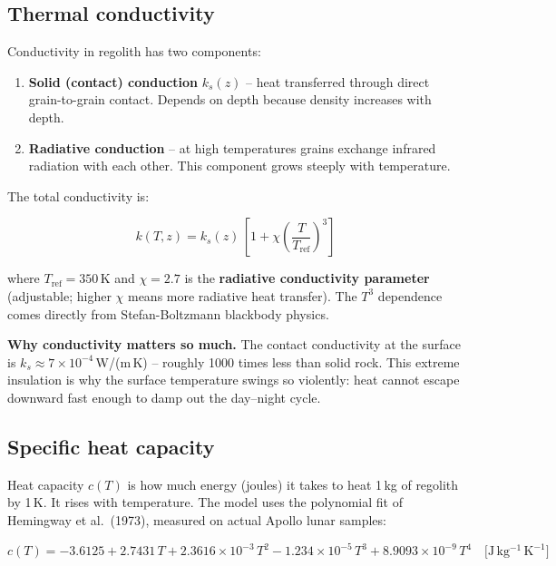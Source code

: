 \documentclass[12pt, a4paper]{article}
\begin{document}
\subsection{Thermal conductivity}

Conductivity in regolith has two components:

\begin{enumerate}[leftmargin=1.5em, itemsep=2pt]
  \item \textbf{Solid (contact) conduction} $k_s(z)$ -- heat
        transferred through direct grain-to-grain contact.
        Depends on depth because density increases with depth.
  \item \textbf{Radiative conduction} -- at high temperatures
        grains exchange infrared radiation with each other.
        This component grows steeply with temperature.
\end{enumerate}

The total conductivity is:

\begin{equation}
  k(T,z) = k_s(z)\,\left[1 + \chi\left(\frac{T}{T_{\mathrm{ref}}}\right)^3\right]
  \label{eq:conductivity}
\end{equation}

where $T_{\mathrm{ref}} = 350$\,K and $\chi = 2.7$ is the
\textbf{radiative conductivity parameter}
(adjustable; higher $\chi$ means more radiative heat transfer).
The $T^3$ dependence comes directly from Stefan-Boltzmann
blackbody physics.

\begin{plainbox}
  \textbf{Why conductivity matters so much.}
  The contact conductivity at the surface is
  $k_s \approx 7\times10^{-4}$\,W/(m\,K) -- roughly 1000 times
  less than solid rock.
  This extreme insulation is why the surface temperature swings
  so violently: heat cannot escape downward fast enough to damp
  out the day--night cycle.
\end{plainbox}

\subsection{Specific heat capacity}

Heat capacity $c(T)$ is how much energy (joules) it takes to heat
1\,kg of regolith by 1\,K.
It rises with temperature.
The model uses the polynomial fit of Hemingway et al.\ (1973),
measured on actual Apollo lunar samples:

\begin{equation}
  c(T) = -3.6125
       + 2.7431\,T
       + 2.3616\times10^{-3}\,T^2
       - 1.234\times10^{-5}\,T^3
       + 8.9093\times10^{-9}\,T^4
  \quad\bigl[\mathrm{J\,kg^{-1}\,K^{-1}}\bigr]
  \label{eq:heat_capacity}
\end{equation}
\end{document}
